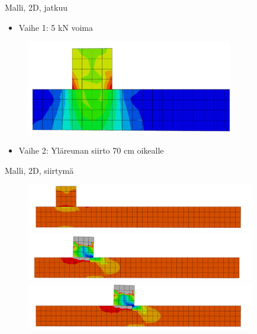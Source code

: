 \documentclass{beamer}
\begin{document}
\begin{frame}{Malli, 2D, jatkuu}

\begin{itemize}
\item Vaihe 1: 5 kN voima
\end{itemize}

\begin{figure}
\includegraphics[width=9cm]{mises.pdf}
\end{figure}

\begin{itemize}
\item Vaihe 2: Yläreunan siirto 70 cm oikealle
\end{itemize}

\end{frame}

\begin{frame}{Malli, 2D, siirtymä}

\begin{figure}
\includegraphics[width=10cm]{anim1.pdf}\\
\includegraphics[width=10cm]{anim2.pdf}\\
\includegraphics[width=10cm]{anim3.pdf}
\end{figure}

\end{frame}
\end{document}
